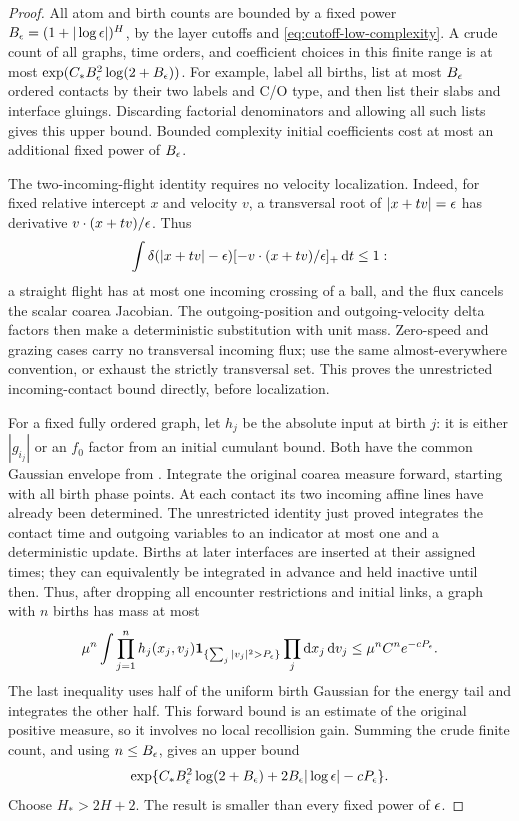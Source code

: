 \begin{proof}
All atom and birth counts are bounded by a fixed power
\(B_\epsilon=(1+|\log\epsilon|)^H\), by the layer cutoffs and
\eqref{eq:cutoff-low-complexity}.
A crude count of all graphs, time orders, and coefficient
choices in this finite range is at most
\(\exp(C_*B_\epsilon^2\log(2+B_\epsilon))\).
For example, label all births, list at most \(B_\epsilon\) ordered
contacts by their two labels and C/O type, and then list their
slabs and interface gluings.  Discarding factorial denominators
and allowing all such lists gives this upper bound.  Bounded
complexity initial coefficients cost at most an additional
fixed power of \(B_\epsilon\).

The two-incoming-flight identity requires no velocity
localization.  Indeed, for fixed relative intercept \(x\)
and velocity \(v\), a transversal root of
\(|x+tv|=\epsilon\) has derivative
\(v\cdot(x+tv)/\epsilon\).  Thus
\[
 \int \delta(|x+tv|-\epsilon)
       [-v\cdot(x+tv)/\epsilon]_+\,\mathrm d t\leq1:
\]
a straight flight has at most one incoming crossing of
a ball, and the flux cancels the scalar coarea Jacobian.
The outgoing-position and outgoing-velocity delta factors
then make a deterministic substitution with unit mass.
Zero-speed and grazing cases carry no transversal incoming
flux; use the same almost-everywhere convention, or exhaust
the strictly transversal set.  This proves the unrestricted
incoming-contact bound directly, before localization.

For a fixed fully ordered graph, let \(h_j\) be the absolute
input at birth \(j\): it is either \(|g_{i_j}|\) or an \(f_0\)
factor from an initial cumulant bound. Both have the common
Gaussian envelope from .
Integrate the original coarea measure forward, starting with
all birth phase points.
At each contact its two incoming affine lines have already
been determined.  The unrestricted identity just proved
integrates the contact time and outgoing
variables to an indicator at most one and a deterministic
update.  Births at later interfaces are inserted at their
assigned times; they can equivalently be integrated in advance
and held inactive until then.  Thus, after dropping all
encounter restrictions and initial links, a graph with \(n\)
births has mass at most
\[
 \mu^n\int\prod_{j=1}^n h_j(x_j,v_j)
       \mathbf 1_{\{\sum_j|v_j|^2>P_\epsilon\}}
       \prod_j\mathrm d x_j\,\mathrm d v_j
 \leq \mu^n C^n e^{-cP_\epsilon}.
\]
The last inequality uses half of the uniform birth Gaussian
for the energy tail and integrates the other half.  This
forward bound is an estimate of the original positive
measure, so it involves no local recollision gain.
Summing the crude finite count, and using \(n\leq B_\epsilon\),
gives an upper bound
\[
 \exp\{C_*B_\epsilon^2\log(2+B_\epsilon)
            +2B_\epsilon|\log\epsilon|-cP_\epsilon\}.
\]
Choose \(H_*>2H+2\).  The result is smaller than every
fixed power of \(\epsilon\).
\end{proof}

